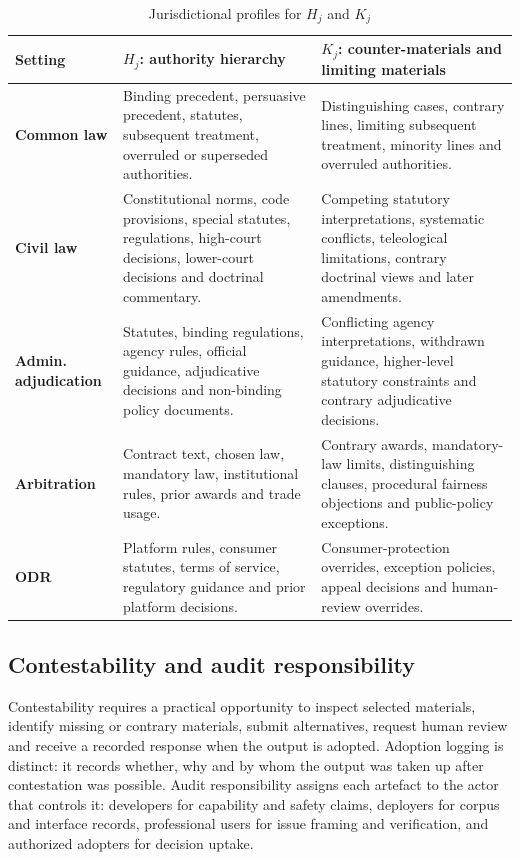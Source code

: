 \documentclass[12pt,a4paper]{article}
\begin{document}
\begin{table}[htbp]
\centering
\caption{Jurisdictional profiles for $H_j$ and $K_j$}
\label{tab:jurisdictional-profiles}
\renewcommand{\arraystretch}{1.15}
\begin{tabularx}{\textwidth}{>{\bfseries}p{2.6cm}YY}
\toprule
Setting & $H_j$: authority hierarchy & $K_j$: counter-materials and limiting materials \\
\midrule
Common law & Binding precedent, persuasive precedent, statutes, subsequent treatment, overruled or superseded authorities. & Distinguishing cases, contrary lines, limiting subsequent treatment, minority lines and overruled authorities. \\
Civil law & Constitutional norms, code provisions, special statutes, regulations, high-court decisions, lower-court decisions and doctrinal commentary. & Competing statutory interpretations, systematic conflicts, teleological limitations, contrary doctrinal views and later amendments. \\
Admin. adjudication & Statutes, binding regulations, agency rules, official guidance, adjudicative decisions and non-binding policy documents. & Conflicting agency interpretations, withdrawn guidance, higher-level statutory constraints and contrary adjudicative decisions. \\
Arbitration & Contract text, chosen law, mandatory law, institutional rules, prior awards and trade usage. & Contrary awards, mandatory-law limits, distinguishing clauses, procedural fairness objections and public-policy exceptions. \\
ODR & Platform rules, consumer statutes, terms of service, regulatory guidance and prior platform decisions. & Consumer-protection overrides, exception policies, appeal decisions and human-review overrides. \\
\bottomrule
\end{tabularx}
\end{table}

\subsection{Contestability and audit responsibility}

Contestability requires a practical opportunity to inspect selected materials, identify missing or contrary materials, submit alternatives, request human review and receive a recorded response when the output is adopted. Adoption logging is distinct: it records whether, why and by whom the output was taken up after contestation was possible. Audit responsibility assigns each artefact to the actor that controls it: developers for capability and safety claims, deployers for corpus and interface records, professional users for issue framing and verification, and authorized adopters for decision uptake.
\end{document}
